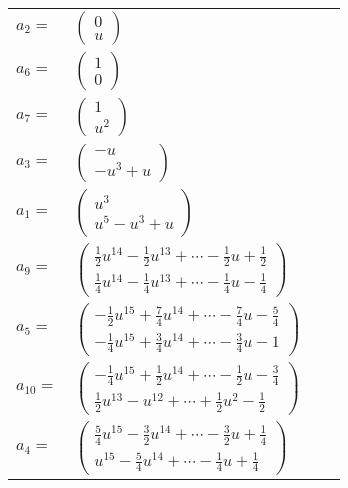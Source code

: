 \documentclass[1p]{elsarticle_modified}
\theoremstyle{definition}
\begin{document}
\begin{tabular}{m{7pt} m{180pt} m{7pt} m{180pt} }
\flushright $a_{2}=$&$\begin{pmatrix}0\\u\end{pmatrix}$ \\
\flushright $a_{6}=$&$\begin{pmatrix}1\\0\end{pmatrix}$ \\
\flushright $a_{7}=$&$\begin{pmatrix}1\\u^2\end{pmatrix}$ \\
\flushright $a_{3}=$&$\begin{pmatrix}- u\\- u^3+u\end{pmatrix}$ \\
\flushright $a_{1}=$&$\begin{pmatrix}u^3\\u^5- u^3+u\end{pmatrix}$ \\
\flushright $a_{9}=$&$\begin{pmatrix}\frac{1}{2} u^{14}-\frac{1}{2} u^{13}+\cdots-\frac{1}{2} u+\frac{1}{2}\\\frac{1}{4} u^{14}-\frac{1}{4} u^{13}+\cdots-\frac{1}{4} u-\frac{1}{4}\end{pmatrix}$ \\
\flushright $a_{5}=$&$\begin{pmatrix}-\frac{1}{2} u^{15}+\frac{7}{4} u^{14}+\cdots-\frac{7}{4} u-\frac{5}{4}\\-\frac{1}{4} u^{15}+\frac{3}{4} u^{14}+\cdots-\frac{3}{4} u-1\end{pmatrix}$ \\
\flushright $a_{10}=$&$\begin{pmatrix}-\frac{1}{4} u^{15}+\frac{1}{2} u^{14}+\cdots-\frac{1}{2} u-\frac{3}{4}\\\frac{1}{2} u^{13}- u^{12}+\cdots+\frac{1}{2} u^2-\frac{1}{2}\end{pmatrix}$ \\
\flushright $a_{4}=$&$\begin{pmatrix}\frac{5}{4} u^{15}-\frac{3}{2} u^{14}+\cdots-\frac{3}{2} u+\frac{1}{4}\\u^{15}-\frac{5}{4} u^{14}+\cdots-\frac{1}{4} u+\frac{1}{4}\end{pmatrix}$ \\

\end{tabular}
\end{document}
